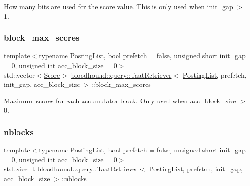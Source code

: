 How many bits are used for the score value. This is only used when init\+\_\+gap $>$ 1. \mbox{\label{classbloodhound_1_1query_1_1TaatRetriever_ac870574844dc3be6c40cf1236e1ff6cc}} 
\subsubsection{\texorpdfstring{block\+\_\+max\+\_\+scores}{block\_max\_scores}}
{\footnotesize\ttfamily template$<$typename Posting\+List, bool prefetch = false, unsigned short init\+\_\+gap = 0, unsigned int acc\+\_\+block\+\_\+size = 0$>$ \\
std\+::vector$<$\mbox{\hyperlink{structbloodhound_1_1Score}{Score}}$>$ \mbox{\hyperlink{classbloodhound_1_1query_1_1TaatRetriever}{bloodhound\+::query\+::\+Taat\+Retriever}}$<$ \mbox{\hyperlink{classbloodhound_1_1PostingList}{Posting\+List}}, prefetch, init\+\_\+gap, acc\+\_\+block\+\_\+size $>$\+::block\+\_\+max\+\_\+scores\hspace{0.3cm}{\ttfamily [protected]}}

Maximum scores for each accumulator block. Only used when acc\+\_\+block\+\_\+size $>$ 0. \mbox{\label{classbloodhound_1_1query_1_1TaatRetriever_a87786d9af7993da498d60304eab245cf}} 
\subsubsection{\texorpdfstring{nblocks}{nblocks}}
{\footnotesize\ttfamily template$<$typename Posting\+List, bool prefetch = false, unsigned short init\+\_\+gap = 0, unsigned int acc\+\_\+block\+\_\+size = 0$>$ \\
std\+::size\+\_\+t \mbox{\hyperlink{classbloodhound_1_1query_1_1TaatRetriever}{bloodhound\+::query\+::\+Taat\+Retriever}}$<$ \mbox{\hyperlink{classbloodhound_1_1PostingList}{Posting\+List}}, prefetch, init\+\_\+gap, acc\+\_\+block\+\_\+size $>$\+::nblocks\hspace{0.3cm}{\ttfamily [protected]}}

